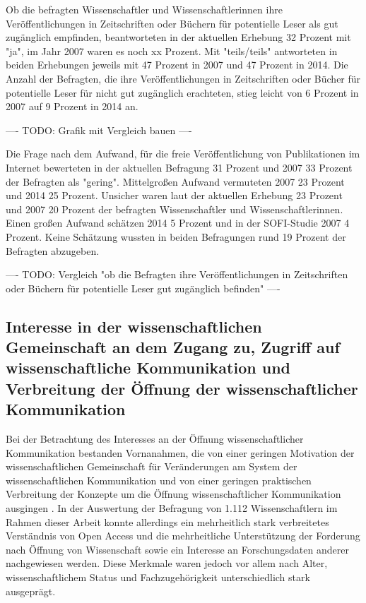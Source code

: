 Ob die befragten Wissenschaftler und Wissenschaftlerinnen ihre Veröffentlichungen in Zeitschriften oder Büchern für potentielle Leser als gut zugänglich empfinden, beantworteten in der aktuellen Erhebung 32 Prozent mit "ja", im Jahr 2007 waren es noch xx Prozent. Mit "teils/teils" antworteten in beiden Erhebungen jeweils mit 47 Prozent in 2007 und 47 Prozent in 2014. Die Anzahl der Befragten, die ihre Veröffentlichungen in Zeitschriften oder Bücher für potentielle Leser für nicht gut zugänglich erachteten, stieg leicht von 6 Prozent in 2007 auf 9 Prozent in 2014 an.

---- TODO: Grafik mit Vergleich bauen ----

Die Frage nach dem Aufwand, für die freie Veröffentlichung von Publikationen im Internet bewerteten in der aktuellen Befragung 31 Prozent und 2007 33 Prozent der Befragten als "gering". Mittelgroßen Aufwand vermuteten 2007 23 Prozent und 2014 25 Prozent. Unsicher waren laut der aktuellen Erhebung 23 Prozent und 2007 20 Prozent der befragten Wissenschaftler und Wissenschaftlerinnen. Einen großen Aufwand schätzen 2014 5 Prozent und in der SOFI-Studie 2007 4 Prozent. Keine Schätzung wussten in beiden Befragungen rund 19 Prozent der Befragten abzugeben.

---- TODO: Vergleich "ob die Befragten ihre Veröffentlichungen in Zeitschriften oder Büchern für potentielle Leser gut zugänglich befinden" ----

\subsection{Interesse in der wissenschaftlichen Gemeinschaft an dem Zugang zu, Zugriff auf wissenschaftliche Kommunikation und Verbreitung der Öffnung der wissenschaftlicher Kommunikation}

Bei der Betrachtung des Interesses an der Öffnung wissenschaftlicher Kommunikation bestanden Vornanahmen, die von einer geringen Motivation der wissenschaftlichen Gemeinschaft für Veränderungen am System der wissenschaftlichen Kommunikation \cite{hagner_2015_sache_buches} und von einer geringen praktischen Verbreitung der Konzepte um die Öffnung wissenschaftlicher Kommunikation ausgingen \cite{Scheliga_2014}. In der Auswertung der Befragung von 1.112 Wissenschaftlern im Rahmen dieser Arbeit konnte allerdings ein mehrheitlich stark verbreitetes Verständnis von Open Access und die mehrheitliche Unterstützung der Forderung nach Öffnung von Wissenschaft sowie ein Interesse an Forschungsdaten anderer nachgewiesen werden. Diese Merkmale waren jedoch vor allem nach Alter, wissenschaftlichem Status und Fachzugehörigkeit unterschiedlich stark ausgeprägt.

